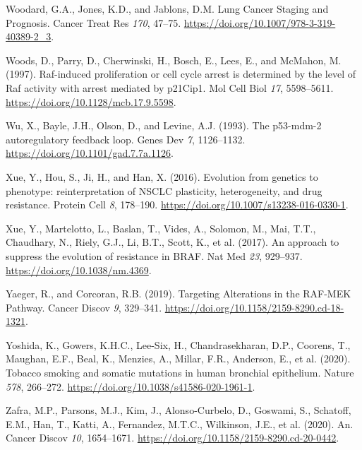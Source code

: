 \begin{CSLReferences}{0}{0}
\leavevmode{}%
Woodard, G.A., Jones, K.D., and Jablons, D.M. Lung Cancer Staging and Prognosis. Cancer Treat Res \emph{170}, 47--75. \url{https://doi.org/10.1007/978-3-319-40389-2_3}.

\leavevmode{}%
Woods, D., Parry, D., Cherwinski, H., Bosch, E., Lees, E., and McMahon, M. (1997). Raf-induced proliferation or cell cycle arrest is determined by the level of Raf activity with arrest mediated by p21Cip1. Mol Cell Biol \emph{17}, 5598--5611. \url{https://doi.org/10.1128/mcb.17.9.5598}.

\leavevmode{}%
Wu, X., Bayle, J.H., Olson, D., and Levine, A.J. (1993). The p53-mdm-2 autoregulatory feedback loop. Genes Dev \emph{7}, 1126--1132. \url{https://doi.org/10.1101/gad.7.7a.1126}.

\leavevmode{}%
Xue, Y., Hou, S., Ji, H., and Han, X. (2016). Evolution from genetics to phenotype: reinterpretation of NSCLC plasticity, heterogeneity, and drug resistance. Protein Cell \emph{8}, 178--190. \url{https://doi.org/10.1007/s13238-016-0330-1}.

\leavevmode{}%
Xue, Y., Martelotto, L., Baslan, T., Vides, A., Solomon, M., Mai, T.T., Chaudhary, N., Riely, G.J., Li, B.T., Scott, K., et al. (2017). An approach to suppress the evolution of resistance in BRAF. Nat Med \emph{23}, 929--937. \url{https://doi.org/10.1038/nm.4369}.

\leavevmode{}%
Yaeger, R., and Corcoran, R.B. (2019). Targeting Alterations in the RAF-MEK Pathway. Cancer Discov \emph{9}, 329--341. \url{https://doi.org/10.1158/2159-8290.cd-18-1321}.

\leavevmode{}%
Yoshida, K., Gowers, K.H.C., Lee-Six, H., Chandrasekharan, D.P., Coorens, T., Maughan, E.F., Beal, K., Menzies, A., Millar, F.R., Anderson, E., et al. (2020). Tobacco smoking and somatic mutations in human bronchial epithelium. Nature \emph{578}, 266--272. \url{https://doi.org/10.1038/s41586-020-1961-1}.

\leavevmode{}%
Zafra, M.P., Parsons, M.J., Kim, J., Alonso-Curbelo, D., Goswami, S., Schatoff, E.M., Han, T., Katti, A., Fernandez, M.T.C., Wilkinson, J.E., et al. (2020). An. Cancer Discov \emph{10}, 1654--1671. \url{https://doi.org/10.1158/2159-8290.cd-20-0442}.


\end{CSLReferences}
